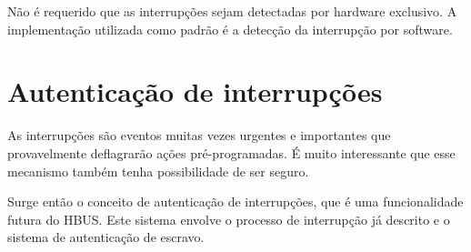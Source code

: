 Não é requerido que as interrupções sejam detectadas por hardware exclusivo. A implementação utilizada como padrão é a detecção da interrupção por software.

\section{Autenticação de interrupções}

As interrupções são eventos muitas vezes urgentes e importantes que provavelmente deflagrarão ações pré-programadas. É muito interessante que esse mecanismo também tenha possibilidade de ser seguro.

Surge então o conceito de autenticação de interrupções, que é uma funcionalidade futura do HBUS. Este sistema envolve o processo de interrupção já descrito e o sistema de autenticação de escravo.
